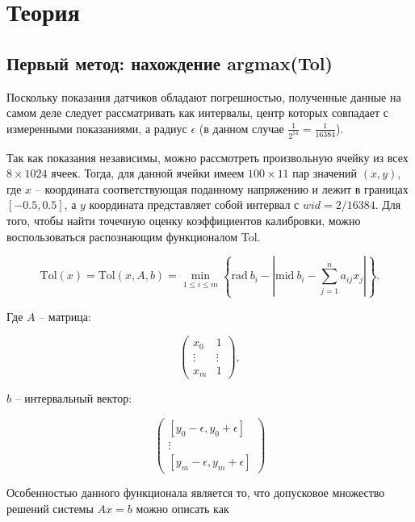 \section{Теория}

\subsection{Первый метод: нахождение argmax(Tol)}
Поскольку показания датчиков обладают погрешностью, полученные данные на самом деле следует рассматривать как интервалы, центр которых совпадает с измеренными показаниями, а радиус $\epsilon$ (в данном случае $\frac{1}{2^{14}} = \frac{1}{16384}$). 

Так как показания независимы, можно рассмотреть произвольную ячейку из всех $8 \times 1024$ ячеек. Тогда, для данной ячейки имеем $100 \times 11$ пар значений $(x, y)$, где $x$ -- координата соответствующая поданному напряжению и лежит в границах $[-0.5, 0.5]$, а $y$ координата представляет собой интервал с $wid = 2/16384$. Для того, чтобы найти точечную оценку коэффициентов калибровки, можно воспользоваться распознающим функционалом Tol. 

\begin{equation}
    \text{Tol}(x) = \text{Tol}(x, A, b) = \min_{1 \leq i \leq m} \left\{ \text{rad}\:b_i - \left| \text{mid}\:b_i - \sum_{j=1}^{n}a_{ij} x_j \right| \right\}.
\end{equation}

Где $A$ -- матрица:

\begin{equation}
    \begin{pmatrix}
        x_0 & 1 \\
        \vdots & \vdots \\
        x_m & 1
    \end{pmatrix},
\end{equation}

$b$ -- интервальный вектор:

\begin{equation}
    \begin{pmatrix}
        [y_0 - \epsilon, y_0 + \epsilon] \\
        \vdots \\
        [y_m - \epsilon, y_m + \epsilon]
    \end{pmatrix}
\end{equation}

Особенностью данного функционала является то, что допусковое множество решений системы $Ax = b$ можно описать как


